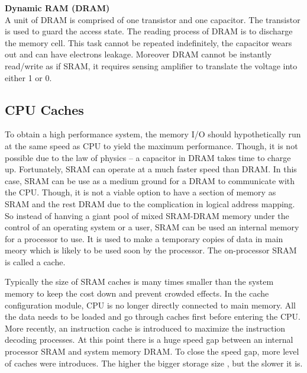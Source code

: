 \documentclass[journal]{IEEEtran}
\begin{document}
\textbf{Dynamic RAM (DRAM)\\}
A unit of DRAM is comprised of one transistor and one capacitor. The 
transistor is used to guard the access state. The reading process of DRAM
is to discharge the memory cell. This task cannot be repeated indefinitely,
the capacitor wears out and can have electrons leakage. Moreover DRAM 
cannot be instantly read/write as if SRAM, it requires sensing amplifier to 
translate the voltage into either 1 or 0.\newline


\subsection{CPU Caches}
To obtain a high performance system, the memory I/O should hypothetically 
run at the same speed as CPU to yield the maximum performance. Though, it is
not possible due to the law of physics -- a capacitor in DRAM takes 
time to charge up.  Fortunately, SRAM can operate at a much faster speed than
DRAM. In this case, SRAM can be use as a medium ground for a DRAM to 
communicate with the CPU.  Though, it is not a viable option to have a 
section of memory as SRAM and the rest DRAM due to the complication in 
logical address mapping. So instead of hanving a giant pool of mixed 
SRAM-DRAM memory under the control of an operating system or a user, SRAM
can be used an internal memory for a processor to use. It is used to 
make a temporary copies of data in main meory which is likely to be used
soon by the processor.  The on-processor SRAM is called a cache. \newline

Typically the size of SRAM caches is many times smaller than the system
memory to keep the cost down and prevent crowded effects. In the cache 
configuration module, CPU is no longer directly connected to main memory. 
All the data needs to be loaded and go through caches first before entering
the CPU. More recently, an instruction cache is introduced to maximize the 
instruction decoding processes. At this point there is a huge speed gap 
between an internal processor SRAM and system memory DRAM. To close the speed
gap, more level of caches were introduces. The higher the bigger storage size
, but the slower it is.\newline
\end{document}
